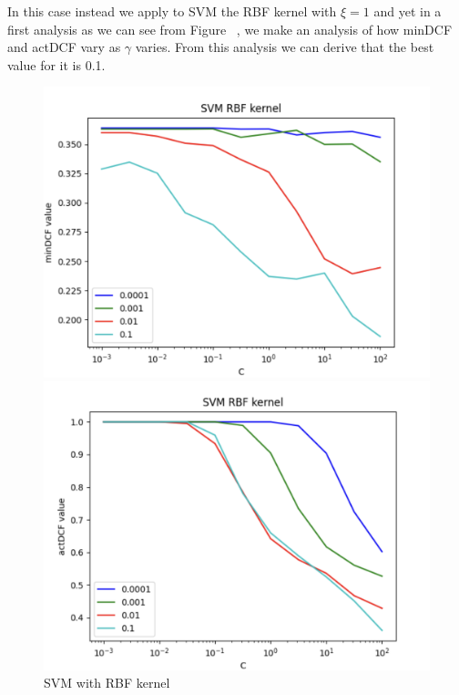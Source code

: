 \documentclass{article}
\begin{document}
    In this case instead we apply to SVM the RBF kernel with \(\xi=1\) and yet in a first analysis as we can see from Figure~ , we make an analysis of how minDCF and actDCF vary as \(\gamma\) varies. From this analysis we can derive that the best value for it is 0.1.
    \begin{figure}[H]
        \centering
        \begin{minipage}{.4\textwidth}
            \centering
            \includegraphics[width=\linewidth]{./img/SVM_RBF1.png}
        \end{minipage}%
        \begin{minipage}{.4\textwidth}
            \centering
            \includegraphics[width=\linewidth]{./img/SVM_RBF2.png}
        \end{minipage}
        \caption{SVM with RBF kernel} %
        \label{fig:SVM_RBF} %
    \end{figure}
\end{document}

